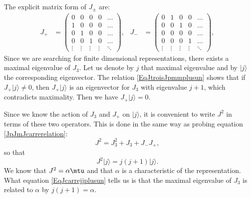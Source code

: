 The explicit matrix form of $J_{\pm}$ are:
\begin{align}
	J_{+} & =
	\begin{pmatrix}
		0      & 0      & 0      & 0      & \hdots \\
		1      & 0      & 0      & 0      & \hdots \\
		0      & 1      & 0      & 0      & \hdots \\
		0      & 0      & 1      & 0      & \hdots \\
		\vdots & \vdots & \vdots & \vdots & \ddots
	\end{pmatrix},
	      & J_{-} & =
	\begin{pmatrix}
		0      & 1      & 0      & 0      & \hdots \\
		0      & 0      & 1      & 0      & \hdots \\
		0      & 0      & 0      & 0      & \hdots \\
		0      & 0      & 0      & 1      & \hdots \\
		\vdots & \vdots & \vdots & \vdots & \ddots
	\end{pmatrix},
\end{align}
Since we are searching for finite dimensional representations, there exists a maximal eigenvalue of $J_3$. Let us denote by $j$ that maximal eigenvalue and by $| j \rangle$ the corresponding eigenvector. The relation \eqref{EqJtroisJpmmplusun} shows that if $J_+| j \rangle\neq 0$, then $J_+| j \rangle$ is an eigenvector for $J_3$ with eigenvalue $j+1$, which contradicts maximality. Then we have $J_+| j \rangle=0$.

Since we know the action of $J_3$ and $J_+$ on $| j \rangle$, it is convenient to write $J^2$ in terms of these two operators. This is done in the same way as probing equation \eqref{JpJmJcarrerelation}:
\begin{equation}
	J^2=J_3^2+J_3+J_-J_+,
\end{equation}
so that
\begin{equation}        \label{EqJcarrejjplusun}
	J^2| j \rangle=j(j+1)| j \rangle.
\end{equation}
We know that $J^2=\alpha\mtu$ and that $\alpha$ is a characteristic of the representation. What equation \eqref{EqJcarrejjplusun} tells us is that the maximal eigenvalue of $J_3$ is related to $\alpha$ by $j(j+1)=\alpha$.

